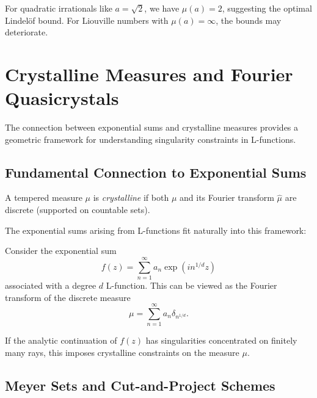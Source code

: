 \begin{example}
For quadratic irrationals like $a = \sqrt{2}$, we have $\mu(a) = 2$, suggesting the optimal Lindelöf bound. For Liouville numbers with $\mu(a) = \infty$, the bounds may deteriorate.
\end{example}

\section{Crystalline Measures and Fourier Quasicrystals}
\label{sec:crystalline_measures}

The connection between exponential sums and crystalline measures provides a geometric framework for understanding singularity constraints in L-functions.

\subsection{Fundamental Connection to Exponential Sums}

\begin{definition}
A tempered measure $\mu$ is \emph{crystalline} if both $\mu$ and its Fourier transform $\hat{\mu}$ are discrete (supported on countable sets).
\end{definition}

The exponential sums arising from L-functions fit naturally into this framework:

\begin{proposition}
Consider the exponential sum
\begin{equation}
f(z) = \sum_{n=1}^{\infty} a_n \exp(i n^{1/d} z)
\end{equation}
associated with a degree $d$ L-function. This can be viewed as the Fourier transform of the discrete measure
\begin{equation}
\mu = \sum_{n=1}^{\infty} a_n \delta_{n^{1/d}}.
\end{equation}
\end{proposition}

If the analytic continuation of $f(z)$ has singularities concentrated on finitely many rays, this imposes crystalline constraints on the measure $\mu$.

\subsection{Meyer Sets and Cut-and-Project Schemes}

